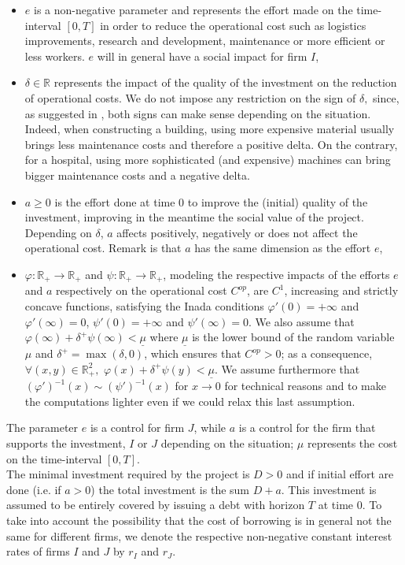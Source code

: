 \documentclass{svjour3}
\begin{document}
\begin{itemize}
\item $e$ is a non-negative parameter and represents the effort made   on the time-interval $[0,T]$ in order to reduce the operational cost such as logistics improvements, research and development, maintenance or more efficient or less workers. $e$  will in general have a social impact for firm $I$,
\item $\delta\in\mathbb{R}$ represents the impact of the quality of the investment on the reduction of operational costs. We do not impose any restriction on the sign of $\delta,$ since, as suggested in \cite{IMP}, both signs can make sense depending on the situation. Indeed, when constructing a building, using more expensive material usually brings less maintenance costs and therefore a positive delta. On the contrary, for a hospital, using more sophisticated (and expensive) machines can bring bigger maintenance costs and a negative delta.
\item 
$a\geq 0$ is the effort done at time $0$ to improve  the (initial) quality of the investment, improving in the meantime the social value of the project. 
 Depending on $\delta$, $a$ affects positively, negatively or does not affect the operational cost. Remark is that $a$ has the same dimension as the effort $e$,
\item $\varphi:\mathbb{R}_+\to\mathbb{R}_+$ and $\psi:\mathbb{R}_+\to\mathbb{R}_+$, modeling the respective impacts of the efforts $e$ and $a$ respectively on the operational cost $C^{op}$, 
 are $C^1$, increasing and strictly concave functions, satisfying the Inada conditions $\varphi'(0)=+\infty$ and $\varphi'(\infty)=0$, $\psi'(0)=+\infty$ and $\psi'(\infty)=0$. 
We also assume that $\varphi(\infty)+\delta^+\psi(\infty)< \underline{\mu}$ where $\underline{\mu}$ is the lower bound of the random variable $\mu$ and $\delta^+=\max(\delta,0)$, which ensures that $C^{op} > 0$; as a consequence, 
$\forall (x,y)\in \mathbb{R}_+^2,$ $\varphi(x)+\delta^+\psi(y)< \underline{\mu}.$
 We assume furthermore that  $(\varphi')^{-1}(x) \sim(\psi')^{-1}(x) $ for
  $x \rightarrow 0$
 for technical reasons and to make the computations lighter even if we could relax this last assumption.

\end{itemize}
\noindent
The parameter $e$ is a control for firm $J$, while $a$ is a control for the firm that supports the investment, $I$ or $J$ depending on the situation;  $\mu$ represents  the cost  on the time-interval $[0,T]$.
 \\
The minimal investment required by the project is $D>0$ and if initial effort are done (i.e. if $a >0$)  the total investment is the sum $D+a$. This investment is assumed to be entirely covered by issuing a debt with horizon $T$ at time $0$. To take into account the possibility that the cost of borrowing is in general not the same for different firms, we denote the respective non-negative constant interest rates of firms $I$ and $J$ by $r_I$ and $r_J$.
\end{document}
